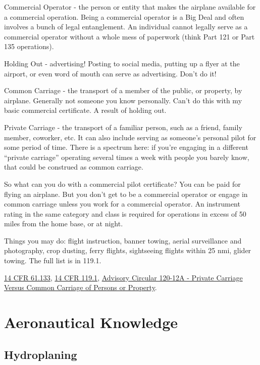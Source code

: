 Commercial Operator - the person or entity that makes the airplane available for a commercial operation. Being a commercial operator is a Big Deal and often involves a bunch of legal entanglement. An individual cannot legally serve as a commercial operator without a whole mess of paperwork (think Part 121 or Part 135 operations).

Holding Out - advertising! Posting to social media, putting up a flyer at the airport, or even word of mouth can serve as advertising. Don't do it!

Common Carriage - the transport of a member of the public, or property, by airplane. Generally not someone you know personally. Can't do this with my basic commercial certificate. A result of holding out.

Private Carriage - the transport of a familiar person, such as a friend, family member, coworker, etc. It can also include serving as someone's personal pilot for some period of time. There is a spectrum here: if you're engaging in a different ``private carriage'' operating several times a week with people you barely know, that could be construed as common carriage.

So what can you do with a commercial pilot certificate? You can be paid for flying an airplane. But you don't get to be a commercial operator or engage in common carriage unless you work for a commercial operator. An instrument rating in the same category and class is required for operations in excess of 50 miles from the home base, or at night.

Things you may do: flight instruction, banner towing, aerial surveillance and photography, crop dusting, ferry flights, sightseeing flights within 25 nmi, glider towing. The full list is in 119.1.

\href{https://www.ecfr.gov/current/title-14/chapter-I/subchapter-D/part-61/subpart-F/section-61.133}{14 CFR 61.133}, \href{https://www.ecfr.gov/current/title-14/chapter-I/subchapter-G/part-119}{14 CFR 119.1}, \href{https://www.faa.gov/regulations_policies/advisory_circulars/index.cfm/go/document.information/documentID/22647}{Advisory Circular 120-12A - Private Carriage Versus Common Carriage of Persons or Property}.

\section{Aeronautical Knowledge}

\subsection{Hydroplaning}

